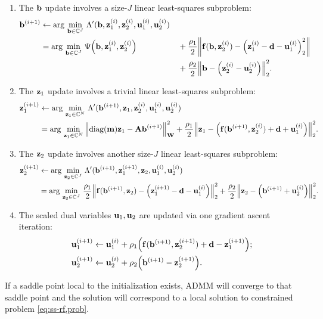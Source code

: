 \begin{enumerate}
	\item{%
		The $\mathbf{b}$ update involves a size-$J$ linear least-squares subproblem:
		\begin{alignat}{2}
			\iter{\bmb}{i+1} 
				&\gets \argmin{\bmb\in\complexes{J}}
					\Lambda'(\bmb,\iter{\bmz}{i}_1,\iter{\bmz}{i}_2,
						\iter{\bmu}{i}_1,\iter{\bmu}{i}_2)
						\nonumber \\
				&= \argmin{\bmb\in\complexes{J}}
					\costa{\bmb,\iter{\bmz}{i}_1,\iter{\bmz}{i}_2}
					&&+ \frac{\rho_1}{2}\norm{%
							\bmf(\bmb,\iter{\bmz}{i}_2)-\paren{\iter{\bmz}{i}_1
							-\bmd-\iter{\bmu}{i}_1}^2_2
						}%
						\nonumber \\
				&
					&&+ \frac{\rho_2}{2}\norm{\bmb-
						\paren{\iter{\bmz}{i}_2-\iter{\bmu}{i}_2}}^2_2.
						\label{eq:ss-rf,b-update}
		\end{alignat}
	}%
	\item{%
		The $\mathbf{z}_1$ update involves a trivial linear least-squares subproblem:
		\begin{align}
			\iter{\bmz}{i+1}_1 
				&\gets \argmin{\bmz_1\in\complexes{N}}
					\Lambda'(\iter{\bmb}{i+1},\bmz_1,\iter{\bmz}{i}_2,
						\iter{\bmu}{i}_1,\iter{\bmu}{i}_2)
						\nonumber \\
				&= \argmin{\bmz_1\in\complexes{N}}
					\norm{\diag{\bmm}\bmz_1-\bmA\iter{\bmb}{i+1}}^2_\bmW
					+ \frac{\rho_1}{2}\norm{%
						\bmz_1-\paren{\bmf(\iter{\bmb}{i+1},\iter{\bmz}{i}_2)
							+ \bmd + \iter{\bmu}{i}_1}
						}^2_2.
						\label{eq:ss-rf,z1-update}
		\end{align}
	}%
	\item{%
		The $\mathbf{z}_2$ update involves another size-$J$ linear least-squares subproblem:
		\begin{align}
			\iter{\bmz}{i+1}_2
				&\gets \argmin{\bmz_2\in\complexes{J}}
					\Lambda'(\iter{\bmb}{i+1},\iter{\bmz}{i+1}_1,\bmz_2,
						\iter{\bmu}{i}_1,\iter{\bmu}{i}_2)
						\nonumber \\
				&= \argmin{\bmz_2\in\complexes{J}}
					\frac{\rho_1}{2}\norm{%
						\bmf(\iter{\bmb}{i+1},\bmz_2)
						-\paren{\iter{\bmz}{i+1}_1-\bmd-\iter{\bmu}{i}_1}
					}^2_2
					+\frac{\rho_2}{2}\norm{\bmz_2-\paren{\iter{\bmb}{i+1}+\iter{\bmu}{i}_2}}^2_2.
					\label{eq:ss-rf,z2-update}
		\end{align}	
	}%
	\item{%
		The scaled dual variables $\mathbf{u}_1,\mathbf{u}_2$ 
		are updated via one gradient ascent iteration:
		\begin{align}
			\iter{\bmu}{i+1}_1 
				&\gets \iter{\bmu}{i}_1 + \rho_1 
					\paren{\bmf(\iter{\bmb}{i+1},\iter{\bmz}{i+1}_2)+\bmd-\iter{\bmz}{i+1}_1};
					\label{eq:ss-rf,u1-update}
					\\
			\iter{\bmu}{i+1}_2 
				&\gets \iter{\bmu}{i}_2 + \rho_2
					\paren{\iter{\bmb}{i+1}-\iter{\bmz}{i+1}_2}.
					\label{eq:ss-rf,u2-update}
		\end{align}
	}%
\end{enumerate}
If a saddle point local to the initialization exists,
ADMM will converge to that saddle point
and the solution will correspond
to a local solution 
to constrained problem \eqref{eq:ss-rf,prob}.
